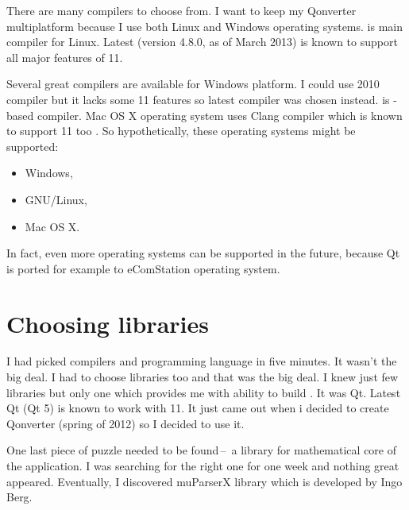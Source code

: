 There are many \cpp{} compilers to choose from. I want to keep my Qonverter multiplatform because I use both Linux and Windows operating systems.  is main compiler for Linux. Latest  (version 4.8.0, as of March 2013) is known to support all major features of \cpp{} 11.

Several great compilers are available for Windows platform. I could use  2010 compiler but it lacks some \cpp{} 11 features so latest  compiler was chosen instead.  is -based compiler. Mac OS X operating system uses Clang compiler which is known to support \cpp{} 11 too \citep{various:clang}. So hypothetically, these operating systems might be supported:
\begin{itemize}
\item Windows,
\item GNU/Linux,
\item Mac OS X.
\end{itemize}
In fact, even more operating systems can be supported in the future, because Qt is ported for example to eComStation \citep{various:ecomstation} operating system.


\section{Choosing libraries}
I had picked compilers and programming language in five minutes. It wasn't the big deal. I had to choose libraries too and that was the big deal. I knew just few libraries but only one which provides me with ability to build . It was Qt. Latest Qt (Qt 5) is known to work with \cpp{} 11. It just came out when i decided to create Qonverter (spring of 2012) so I decided to use it.

One last piece of puzzle needed to be found\,--\, a library for mathematical core of the application. I was searching for the right one for one week and nothing great appeared. Eventually, I discovered muParserX library \citep{various:muparserx} which is developed by Ingo Berg.